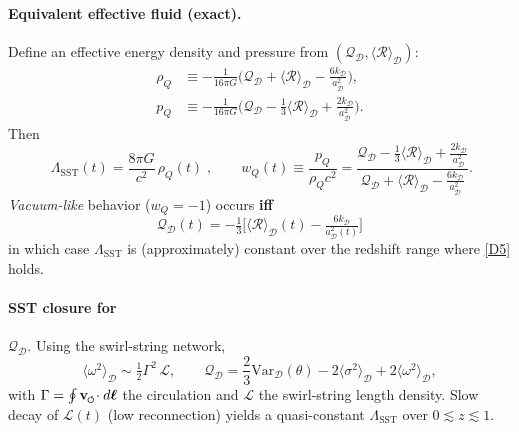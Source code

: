 \documentclass[reprint,aps,onecolumn,nofootinbib]{revtex4-2}
\newcommand{\swirlarrow}{%
    \mathchoice{\mkern-2mu\scriptstyle\boldsymbol{\circlearrowleft}}%
    {\mkern-2mu\scriptstyle\boldsymbol{\circlearrowleft}}%
    {\mkern-2mu\scriptscriptstyle\boldsymbol{\circlearrowleft}}%
    {\mkern-2mu\scriptscriptstyle\boldsymbol{\circlearrowleft}}%
}
\newcommand{\vswirl}{\mathbf{v}_{\swirlarrow}}
\begin{document}
    \paragraph{Equivalent effective fluid (exact).}
        Define an effective energy density and pressure from $(\mathcal{Q}_\mathcal{D},\langle \mathcal{R} \rangle_\mathcal{D})$:
        \begin{align}
        \rho_{Q} &\equiv -\frac{1}{16\pi G}\Big(\mathcal{Q}_\mathcal{D}+\langle \mathcal{R}\rangle_\mathcal{D}
        - \tfrac{6k_\mathcal{D}}{a_\mathcal{D}^{2}}\Big), \tag{D2}\label{D2}\\
        p_{Q} &\equiv -\frac{1}{16\pi G}\Big(\mathcal{Q}_\mathcal{D}-\tfrac{1}{3}\langle \mathcal{R}\rangle_\mathcal{D}
        + \tfrac{2k_\mathcal{D}}{a_\mathcal{D}^{2}}\Big). \tag{D3}\label{D3}
        \end{align}
        Then
        \[
            \boxed{\;
            \Lambda_{\!\mathrm{SST}}(t)=\frac{8\pi G}{c^2}\,\rho_{Q}(t)
                \;},\qquad
            w_Q(t)\equiv\frac{p_Q}{\rho_Q c^2}
            =\frac{\mathcal{Q}_\mathcal{D}-\tfrac{1}{3}\langle \mathcal{R}\rangle_\mathcal{D}
            +\tfrac{2k_\mathcal{D}}{a_\mathcal{D}^{2}}}
            {\mathcal{Q}_\mathcal{D}+\langle \mathcal{R}\rangle_\mathcal{D}
            -\tfrac{6k_\mathcal{D}}{a_\mathcal{D}^{2}}}.
            \tag{D4}\label{D4}
        \]
        \emph{Vacuum-like} behavior ($w_Q=-1$) occurs \textbf{iff}
        \[
            \boxed{\;\mathcal{Q}_\mathcal{D}(t)= -\tfrac{1}{3}\Big[\langle \mathcal{R}\rangle_\mathcal{D}(t)-\tfrac{6k_\mathcal{D}}{a_\mathcal{D}^{2}(t)}\Big]\;}
            \tag{D5}\label{D5}
        \]
        in which case $\Lambda_{\!\mathrm{SST}}$ is (approximately) constant over the redshift range where \eqref{D5} holds.

    \paragraph{SST closure for }\(\mathcal{Q}_\mathcal{D}\).
        Using the swirl-string network,
        \[
            \langle \omega^2 \rangle_\mathcal{D} \sim \tfrac{1}{2}\Gamma^{2}\,\mathcal{L},\qquad
            \mathcal{Q}_\mathcal{D}=\frac{2}{3}\mathrm{Var}_\mathcal{D}(\theta)
            -2\langle \sigma^2\rangle_\mathcal{D}+2\langle \omega^2\rangle_\mathcal{D},
        \]
        with $\Gamma=\oint \vswirl\!\cdot d\boldsymbol{\ell}$ the circulation and
        $\mathcal{L}$ the swirl-string length density. Slow decay of $\mathcal{L}(t)$ (low reconnection) yields a quasi-constant $\Lambda_{\!\mathrm{SST}}$ over $0\lesssim z\lesssim 1$.
\end{document}
